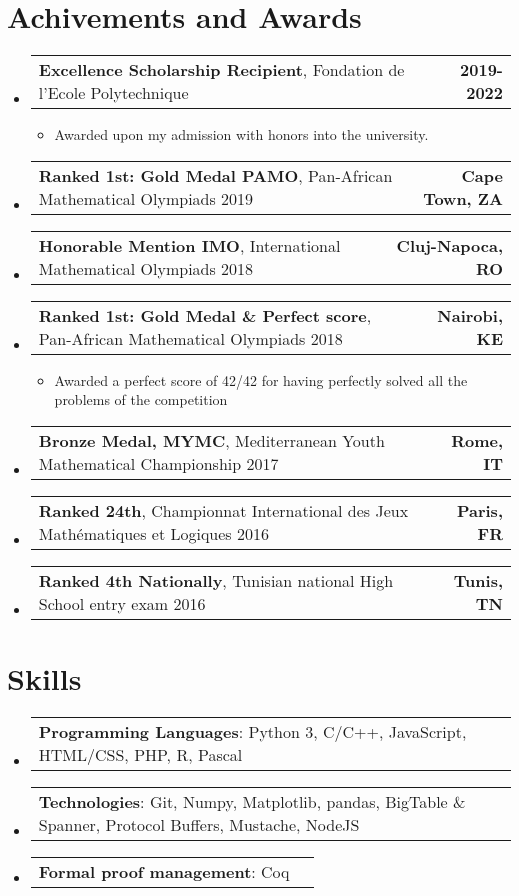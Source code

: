 \documentclass[letterpaper,11pt]{article}
\makeatletter
\newcommand{\resumeItem}[2]{
  \item\small{
    \textbf{#1}{#2 \vspace{-2pt}}
  }
}
\newcommand{\resumePoint}[2]{
  \item
    \begin{tabular*}{0.97\textwidth}[t]{l@{\extracolsep{\fill}}r}
      #1 & \textbf{\small #2}
    \end{tabular*}
}
\newcommand{\resumeSubHeadingListStart}{\begin{itemize}[leftmargin=*]}
\newcommand{\resumeSubHeadingListEnd}{\end{itemize}}
\newcommand{\resumeItemListStart}{\begin{itemize}}
\newcommand{\resumeItemListEnd}{\end{itemize}\vspace{-5pt}}
\makeatother
\begin{document}
\section{Achivements and Awards}
  \resumeSubHeadingListStart
    \resumePoint
      {\textbf{Excellence Scholarship Recipient}, Fondation de l'Ecole Polytechnique}{2019-2022}
      \vspace{-0.6cm}\resumeItemListStart
        \resumeItem{}{Awarded upon my admission with honors into the university.}
      \resumeItemListEnd
    \resumePoint
      {\textbf{Ranked 1st: Gold Medal PAMO}, Pan-African Mathematical Olympiads 2019}{Cape Town, ZA}
      \vspace{-0.6cm}\resumeItemListStart
      \resumeItemListEnd
   \resumePoint
      {\textbf{Honorable Mention IMO}, International Mathematical Olympiads 2018}{Cluj-Napoca, RO}
      \vspace{-0.6cm}\resumeItemListStart
      \resumeItemListEnd
    \resumePoint
      {\textbf{Ranked 1st: Gold Medal \& Perfect score}, Pan-African Mathematical Olympiads 2018}{Nairobi, KE}
      \vspace{-0.6cm}\resumeItemListStart
        \resumeItem{}{Awarded a perfect score of 42/42 for having perfectly solved all the problems of the competition}
      \resumeItemListEnd
    \resumePoint
      {\textbf{Bronze Medal, MYMC}, Mediterranean Youth Mathematical Championship 2017}{Rome, IT}
      \vspace{-0.6cm}\resumeItemListStart
      \resumeItemListEnd
    \resumePoint
      {\textbf{Ranked 24th}, Championnat International des Jeux Mathématiques et Logiques 2016}{Paris, FR}
      \vspace{-0.6cm}\resumeItemListStart
      \resumeItemListEnd
    \resumePoint
      {\textbf{Ranked 4th Nationally}, Tunisian national High School entry exam 2016}{Tunis, TN}
      \vspace{-0.6cm}\resumeItemListStart
      \resumeItemListEnd

  \resumeSubHeadingListEnd

 \section{Skills}
  \resumeSubHeadingListStart
    \resumePoint
     {\textbf{Programming Languages}: Python 3, C/C++, JavaScript, HTML/CSS, PHP, R, Pascal}{}
   \vspace*{-0.7cm}
    \resumePoint
     {\textbf{Technologies}: Git, Numpy, Matplotlib, pandas, BigTable \& Spanner, Protocol Buffers, Mustache, NodeJS}{}
    \vspace*{-0.7cm}
    \resumePoint
     {\textbf{Formal proof management}: Coq}{}
  \resumeSubHeadingListEnd
\end{document}
